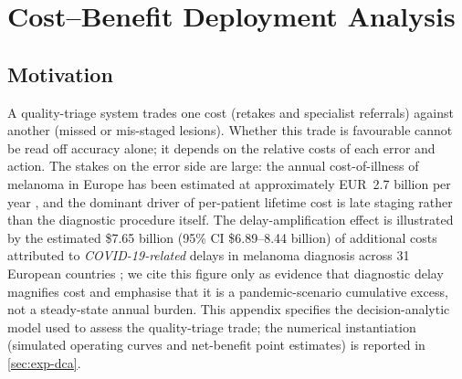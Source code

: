 
\section{Cost--Benefit Deployment Analysis}\label{app:a20}

\subsection{Motivation}\label{app:a20-motiv}
A quality-triage system trades one cost (retakes and specialist referrals) against another (missed or
mis-staged lesions). Whether this trade is favourable cannot be read off accuracy alone; it depends on
the relative costs of each error and action. The stakes on the error side are large: the annual
cost-of-illness of melanoma in Europe has been estimated at approximately EUR~2.7 billion per year
\citep{krensel2019melanomacost}, and the dominant driver of per-patient lifetime cost is late staging
rather than the diagnostic procedure itself. The delay-amplification effect is illustrated by the
estimated \$7.65 billion (95\% CI \$6.89--8.44 billion) of additional costs attributed to
\emph{COVID-19-related} delays in melanoma diagnosis across 31 European countries
\citep{maul2024melanomacovid}; we cite this figure only as evidence that diagnostic delay magnifies cost
and emphasise that it is a pandemic-scenario cumulative excess, not a steady-state annual burden. This
appendix specifies the decision-analytic model used to assess the quality-triage trade; the numerical
instantiation (simulated operating curves and net-benefit point estimates) is reported in
\cref{sec:exp-dca}.

